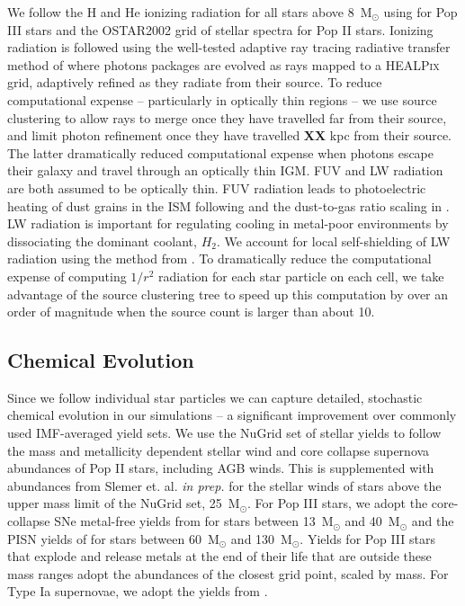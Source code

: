 \documentclass[12pt]{article} %
\begin{document}
We follow the H and He ionizing radiation for all stars above 8~M$_{\odot}$ using \cite{Schaerer2002} for Pop III stars and the OSTAR2002 \citep{Lanz2003} grid of stellar spectra for Pop II stars. Ionizing radiation is followed using the well-tested adaptive ray tracing radiative transfer method of \citep{WiseAbel2011} where photons packages are evolved as rays mapped to a \textsc{HEALPix} grid, adaptively refined as they radiate from their source. To reduce computational expense -- particularly in optically thin regions -- we use source clustering to allow rays to merge once they have travelled far from their source, and limit photon refinement once they have travelled \textbf{XX} kpc from their source. The latter dramatically reduced computational expense when photons escape their galaxy and travel through an optically thin IGM. FUV and LW radiation are both assumed to be optically thin. FUV radiation leads to photoelectric heating of dust grains in the ISM following \cite{Wolfire2003} and the dust-to-gas ratio scaling in \cite{Remy-Ruyer2014}. LW radiation is important for regulating cooling in metal-poor environments by dissociating the dominant coolant, $H_2$. We account for local self-shielding of LW radiation using the method from \cite{Wolcott-Green2011}. To dramatically reduce the computational expense of computing $1/r^2$ radiation for each star particle on each cell, we take advantage of the source clustering tree to speed up this computation by over an order of magnitude when the source count is larger than about 10.

\subsection{Chemical Evolution}

Since we follow individual star particles we can capture detailed, stochastic chemical evolution in our simulations -- a significant improvement over commonly used IMF-averaged yield sets. We use the NuGrid set of stellar yields \citep{Pignatari2016,Ritter2018} to follow the mass and metallicity dependent stellar wind and core collapse supernova abundances of Pop II stars, including AGB winds. This is supplemented with abundances from Slemer et. al. \textit{in prep.} for the stellar winds of stars above the upper mass limit of the NuGrid set, 25~M$_{\odot}$. For Pop III stars, we adopt the core-collapse SNe metal-free yields from \cite{Nomoto2006} for stars between 13~M$_{\odot}$ and 40~M$_{\odot}$ and the PISN yields of \cite{HegerWoosley2002} for stars between 60~M$_{\odot}$ and 130~M$_{\odot}$. Yields for Pop III stars that explode and release metals at the end of their life that are outside these mass ranges adopt the abundances of the closest grid point, scaled by mass. For Type Ia supernovae, we adopt the yields from \cite{Thielemann1986}.
\end{document}

